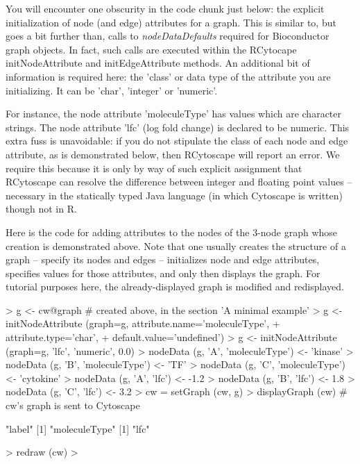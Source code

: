 \documentclass[12pt]{article}
\begin{document}
You will encounter one obscurity in the code chunk just below: the explicit initialization of node (and edge) attributes
for a graph.  This is similar to, but goes a bit further than, calls to \emph{nodeDataDefaults} required for
Bioconductor graph objects.  In fact, such calls are executed within the RCytocape initNodeAttribute and
initEdgeAttribute methods.  An additional bit of information is required here: the 'class' or data type of the attribute
you are initializing.  It can be 'char', 'integer' or 'numeric'.

For instance, the node attribute 'moleculeType' has values which are character strings.  The node attribute
'lfc' (log fold change) is declared to be numeric.  This extra fuss is unavoidable: if you do not stipulate the
class of each node and edge attribute, as is demonstrated below, then RCytoscape will report an error.  We require this
because it is only by way of such explicit assignment that RCytoscape can resolve the difference between integer and
floating point values -- necessary in the statically typed Java language (in which Cytoscape is written) though not in
R.

Here is the code for adding attributes to the nodes of the 3-node graph whose creation is demonstrated above.  Note that
one usually creates the structure of a graph -- specify its nodes and edges -- initializes node and edge attributes,
specifies values for those attributes, and only then displays the graph.  For tutorial purposes here, the
already-displayed graph is modified and redisplayed.

\begin{Schunk}
\begin{Sinput}
>   g <- cw@graph   # created above, in the section  'A minimal example'
>   g <- initNodeAttribute (graph=g,  attribute.name='moleculeType',
+                           attribute.type='char',
+                           default.value='undefined')
>   g <- initNodeAttribute (graph=g,  'lfc', 'numeric', 0.0)
>   nodeData (g, 'A', 'moleculeType') <- 'kinase'
>   nodeData (g, 'B', 'moleculeType') <- 'TF'
>   nodeData (g, 'C', 'moleculeType') <- 'cytokine'
>   nodeData (g, 'A', 'lfc') <- -1.2
>   nodeData (g, 'B', 'lfc') <- 1.8
>   nodeData (g, 'C', 'lfc') <- 3.2
>   cw = setGraph (cw, g)
>   displayGraph (cw)    # cw's graph is sent to Cytoscape
\end{Sinput}
\begin{Soutput}
[1] "label"
[1] "moleculeType"
[1] "lfc"
\end{Soutput}
\begin{Sinput}
>   redraw (cw)
>   
\end{Sinput}
\end{Schunk}
\end{document}
